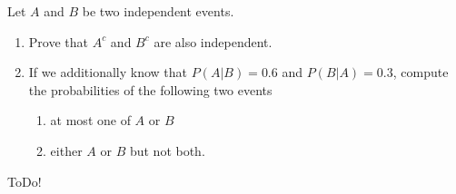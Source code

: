 
\begin{exercise}[Independence]

Let $A$ and $B$ be two independent events.

\begin{enumerate}[label = (\alph*)]

    \item Prove that $A^c$ and $B^c$ are also independent.

    \item If we additionally know that $P(A | B) = 0.6$ and $P(B | A) = 0.3$, compute the probabilities of the following two events

    \begin{enumerate}[label = (\roman*)]
        \item at most one of $A$ or $B$
        \item either $A$ or $B$ but not both.
    \end{enumerate}

\end{enumerate}

\end{exercise}


\begin{solution}

ToDo!

\end{solution}

